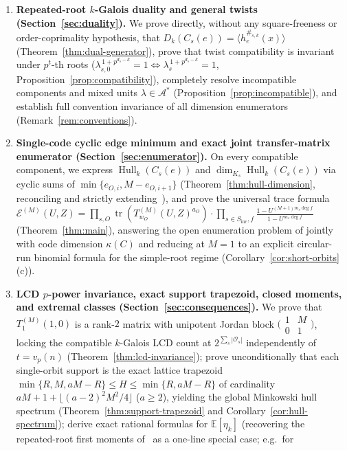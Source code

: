 \documentclass[preprint,12pt]{elsarticle}
\newcommand{\A}{\mathcal A}
\newcommand{\Os}{\mathcal O_s}
\newcommand{\Epoly}{\mathscr E}
\newcommand{\Hull}{\operatorname{Hull}}
\newcommand{\tr}{\operatorname{tr}}
\newcommand{\Dk}{D_k}
\numberwithin{equation}{section}
\theoremstyle{plain}
\theoremstyle{definition}
\theoremstyle{remark}
\begin{document}
\begin{enumerate}
\item \textbf{Repeated-root $k$-Galois duality and general twists
(Section~\ref{sec:duality}).} We prove directly, without any square-freeness or
order-coprimality hypothesis, that $\Dk(C_s(e))=\langle h_e^{\#_{s,k}}(x)\rangle$
(Theorem~\ref{thm:dual-generator}), prove that twist compatibility is invariant
under $p^t$-th roots ($\lambda_{s,0}^{\,1+p^{d_s-k}}=1\iff\lambda_s^{\,1+p^{d_s-k}}=1$,
Proposition~\ref{prop:compatibility}), completely resolve incompatible components
and mixed units $\lambda\in\A^*$ (Proposition~\ref{prop:incompatible}), and
establish full convention invariance of all dimension enumerators
(Remark~\ref{rem:conventions}).
\item \textbf{Single-code cyclic edge minimum and exact joint transfer-matrix
enumerator (Section~\ref{sec:enumerator}).} On every compatible component, we
express $\Hull_k(C_s(e))$ and $\dim_{K_s}\Hull_k(C_s(e))$ via cyclic sums of
$\min\{e_{O,i},M-e_{O,i+1}\}$ (Theorem~\ref{thm:hull-dimension}, reconciling and
strictly extending~\cite[Theorem~8]{debnathAffine2026}), and prove the universal
trace formula $\Epoly^{(M)}(U,Z)=\prod_{s,O}\tr(T_{w_O}^{(M)}(U,Z)^{a_O})\cdot
\prod_{s\in S_{\mathrm{inc}},f}\frac{1-U^{(M+1)m_s\deg f}}{1-U^{m_s\deg f}}$
(Theorem~\ref{thm:main}), answering the open enumeration problem of
\cite[p.~23]{debnathAffine2026} jointly with code dimension $\kappa(C)$ and
reducing at $M=1$ to an explicit circular-run binomial formula for the
simple-root regime (Corollary~\ref{cor:short-orbits}\textup{(c)}).
\item \textbf{LCD $p$-power invariance, exact support trapezoid, closed moments,
and extremal classes (Section~\ref{sec:consequences}).} We prove that $T_1^{(M)}(1,0)$
is a rank-$2$ matrix with unipotent Jordan block $\bigl(\begin{smallmatrix}1 & M\\
0 & 1\end{smallmatrix}\bigr)$, locking the compatible $k$-Galois LCD count at
$2^{\sum_s|\Os|}$ independently of $t=v_p(n)$ (Theorem~\ref{thm:lcd-invariance});
prove unconditionally that each single-orbit support is the exact lattice
trapezoid $\min\{R,M,aM-R\}\le H\le\min\{R,aM-R\}$ of cardinality
$aM+1+\lfloor(a-2)^2 M^2/4\rfloor$ ($a\ge 2$), yielding the global Minkowski hull
spectrum (Theorem~\ref{thm:support-trapezoid} and Corollary~\ref{cor:hull-spectrum});
derive exact rational formulas for $\mathbb E[\eta_k]$ (recovering the repeated-root
first moments of~\cite{debnathAverage2025} as a one-line special case; e.g.\ for

\end{enumerate}
\end{document}
